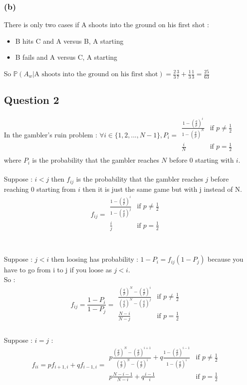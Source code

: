 \documentclass{article}
\begin{document}
\subsubsection*{(b)}
There is only two cases if A shoots into the ground on his first shot : \begin{itemize}
    \item B hits C and A versus B, A starting
    \item B fails and A versus C, A starting
\end{itemize}
So $\mathbb{P}(A_w |\text{A shoots into the ground on his first shot}) = \frac{2}{3}\frac{3}{7}+\frac{1}{3}\frac{1}{3} = \frac{25}{63}$
\subsection*{Question 2}
In the gambler's ruin problem : 
$\forall i\in \{1,2,...,N-1\}, P_i =
\begin{array}{cc}
    \frac{1-(\frac{q}{p})^i}{1-(\frac{q}{p})^N} & \text{if } p\neq \frac{1}{2}\\
    \frac{i}{N} & \text{if } p = \frac{1}{2}\\
\end{array}$
 where $P_i$ is the probability that the gambler reaches $N$ before 0 starting with $i$.
\\\\
Suppose : $i<j$ then $f_{ij}$ is the probability that the gambler reaches $j$ before reaching 0 starting from $i$ then it is just the same game but with j instead of N. 
\\
$$\boxed{f_{ij} =
\begin{array}{cc}
    \frac{1-(\frac{q}{p})^i}{1-(\frac{q}{p})^j} & \text{if } p\neq \frac{1}{2}\\
    \frac{i}{j} & \text{if } p = \frac{1}{2}\\
\end{array}}$$
\\\\
Suppose : $j<i$ then loosing has probability : $1-P_i = f_{ij}(1-P_j)$ because you have to go from i to j if you loose as $j<i$.
\\
So : $$\boxed{f_{ij} = \frac{1-P_i}{1-P_j} = \begin{array}{cc}
    \frac{(\frac{q}{p})^N-(\frac{q}{p})^i}{(\frac{q}{p})^N-(\frac{q}{p})^j}&\text{if } p \neq \frac{1}{2}\\
    \frac{N-i}{N-j}&\text{if } p = \frac{1}{2}\\
\end{array} }$$
\\
Suppose : $i=j$ : $$\boxed{f_{ii} = pf_{i+1,i}+qf_{i-1,i} = \begin{array}{cc}
    p\frac{(\frac{q}{p})^N-(\frac{q}{p})^{i+1}}{(\frac{q}{p})^N-(\frac{q}{p})^i} + q\frac{1-(\frac{q}{p})^{i-1}}{1-(\frac{q}{p})^i}&\text{if } p \neq \frac{1}{2}\\
    p\frac{N-i-1}{N-i}+q\frac{i-1}{i}&\text{if } p = \frac{1}{2}\\
\end{array}}$$
\end{document}
